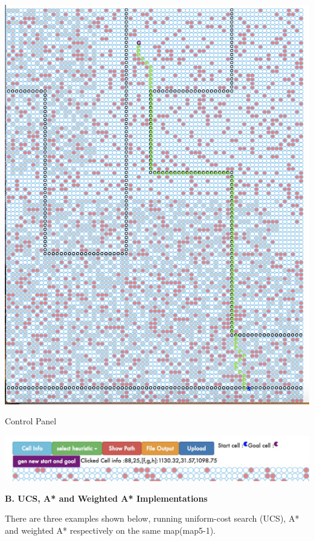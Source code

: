 \documentclass[12pt, letterpaper]{article}
\begin{document}
\includegraphics[scale=0.40]{"a-map1-4"}

\medskip

Control Panel

\includegraphics[scale=0.4]{"control-panel"}

\pagebreak %

\noindent \textbf{B. UCS, A* and Weighted A* Implementations}

There are three examples shown below, running uniform-cost search (UCS), A* and weighted A* respectively on the same map(map5-1).
\end{document}

